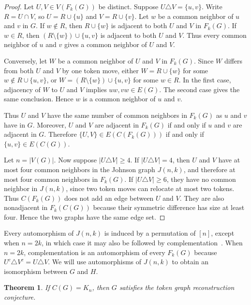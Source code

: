 \documentclass[11pt]{amsart}
\newtheorem{theorem}{Theorem}
\begin{document}
\begin{proof}
Let $U,V\in V(F_k(G))$ be distinct. Suppose $U\triangle V=\{u,v\}$. Write $R=U\cap V$, so $U=R\cup\{u\}$ and $V=R\cup\{v\}$. Let $w$ be a common neighbor of $u$ and $v$ in $G$. If $w\notin R$, then $R\cup\{w\}$ is adjacent to both $U$ and $V$ in $F_k(G)$. If $w\in R$, then $(R\setminus\{w\})\cup\{u,v\}$ is adjacent to both $U$ and $V$. Thus every common neighbor of $u$ and $v$ gives a common neighbor of $U$ and $V$.

Conversely, let $W$ be a common neighbor of $U$ and $V$ in $F_k(G)$. Since $W$ differs from both $U$ and $V$ by one token move, either $W=R\cup\{w\}$ for some $w\notin R\cup\{u,v\}$, or $W=(R\setminus\{w\})\cup\{u,v\}$ for some $w\in R$. In the first case, adjacency of $W$ to $U$ and $V$ implies $uw,vw\in E(G)$. The second case gives the same conclusion. Hence $w$ is a common neighbor of $u$ and $v$.

Thus $U$ and $V$ have the same number of common neighbors in $F_k(G)$ as $u$ and $v$ have in $G$. Moreover, $U$ and $V$ are adjacent in $F_k(G)$ if and only if $u$ and $v$ are adjacent in $G$. Therefore $\{U,V\}\in E(C(F_k(G)))$ if and only if $\{u,v\}\in E(C(G))$.

Let $n=|V(G)|$. Now suppose $|U\triangle V|\geq 4$. If $|U\triangle V|=4$, then $U$ and $V$ have at most four common neighbors in the Johnson graph $J(n,k)$, and therefore at most four common neighbors in $F_k(G)$. If $|U\triangle V|\geq 6$, they have no common neighbor in $J(n,k)$, since two token moves can relocate at most two tokens. Thus $C(F_k(G))$ does not add an edge between $U$ and $V$. They are also nonadjacent in $F_k(C(G))$ because their symmetric difference has size at least four. Hence the two graphs have the same edge set.
\end{proof}

Every automorphism of $J(n,k)$ is induced by a permutation of $[n]$, except when $n=2k$, in which case it may also be followed by complementation~\cite{RamrasDonovan2011,Ganesan2018}. When $n=2k$, complementation is an automorphism of every $F_k(G)$ because $U^c\triangle V^c=U\triangle V$. We will use automorphisms of $J(n,k)$ to obtain an isomorphism between $G$ and $H$.

\begin{theorem}\label{thm:deterministic}
If $C(G)=K_n$, then $G$ satisfies the token graph reconstruction conjecture.
\end{theorem}
\end{document}
